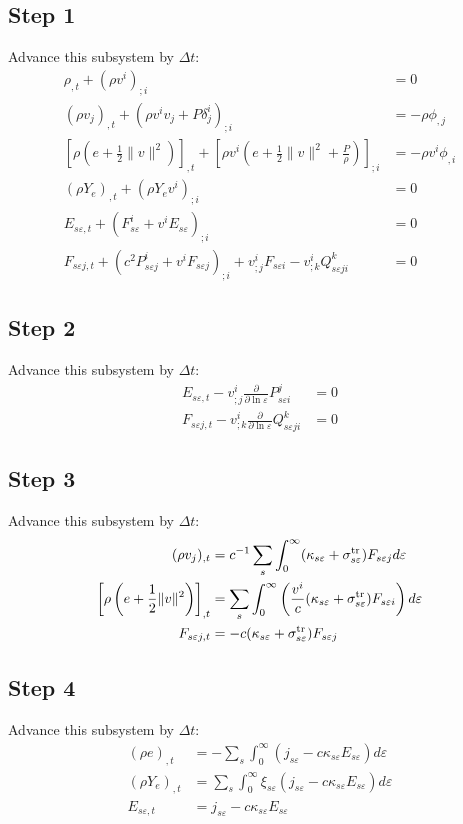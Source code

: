 \documentclass{article}
\begin{document}
\subsection{Step 1}
Advance this subsystem by $\Delta t$:
\begin{align}
\rho_{,t} + (\rho v^i)_{;i}  &= 0 \\
(\rho v_j)_{,t} + (\rho v^i v_j + P \delta^i_j)_{;i} &= -\rho \phi_{,j}\\
\left[\rho \left(e + \frac{1}{2} \lVert v\rVert^2\right)\right]_{,t} + \left[\rho v^i \left(e + \frac{1}{2} \lVert v\rVert^2 + \frac{P}{\rho}\right)\right]_{;i} &= -\rho v^i \phi_{,i} \\ 
(\rho Y_e)_{,t} + (\rho Y_e v^i)_{;i} &= 0 \\
E_{s\varepsilon,t} + (F_{s\varepsilon}^i + v^i E_{s\varepsilon})_{;i} &= 0 \\
F_{s\varepsilon j,t} + (c^2 P_{s\varepsilon j}^i + v^i F_{s\varepsilon j})_{;i} + v^i_{;j} F_{s\varepsilon i} - v^i_{;k} Q^k_{s\varepsilon ji} &= 0 
\end{align}

\subsection{Step 2}
Advance this subsystem by $\Delta t$:
\begin{align}
E_{s\varepsilon,t} - v^i_{;j}\frac{\partial}{\partial\ln\varepsilon} P_{s\varepsilon i}^j &= 0 \\
F_{s\varepsilon j,t} - v^i_{;k} \frac{\partial}{\partial\ln\varepsilon} Q^k_{s\varepsilon ji} &= 0
\end{align}

\subsection{Step 3}
Advance this subsystem by $\Delta t$:
\begin{align}
(\rho v_j)_{,t} &= c^{-1} \sum_s \int_0^\infty (\kappa_{s\varepsilon} + \sigma^{\rm tr}_{s\varepsilon}) F_{s\varepsilon j} d\varepsilon \\
\left[\rho \left(e + \frac{1}{2} \lVert v\rVert^2\right)\right]_{,t} &= \sum_s \int_0^\infty \left(\frac{v^i}{c} (\kappa_{s\varepsilon} + \sigma^{\rm tr}_{s\varepsilon}) F_{s\varepsilon i}\right) d\varepsilon \\
F_{s\varepsilon j,t} &= -c(\kappa_{s\varepsilon} + \sigma^{\rm tr}_{s\varepsilon}) F_{s\varepsilon j}
\end{align}

\subsection{Step 4}
Advance this subsystem by $\Delta t$:
\begin{align}
(\rho e)_{,t} &= -\sum_s \int_0^\infty \left(j_{s\varepsilon} - c \kappa_{s\varepsilon} E_{s\varepsilon}\right) d\varepsilon \\
(\rho Y_e)_{,t}  &= \sum_s \int_0^\infty \xi_{s\varepsilon} (j_{s\varepsilon} - c \kappa_{s\varepsilon} E_{s\varepsilon}) d\varepsilon \\
E_{s\varepsilon,t} &= j_{s\varepsilon} - c \kappa_{s\varepsilon} E_{s\varepsilon}
\end{align}
\end{document}
